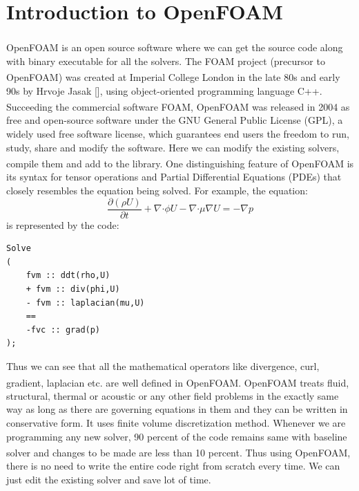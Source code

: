 \chapter{Introduction to \texorpdfstring{OpenFOAM\textsuperscript{\textregistered}}{Introduction to OpenFOAMs} }

\label{openfoam}

OpenFOAM\textsuperscript{\textregistered} is an open source software where we can get the source code along with binary executable for all the solvers. The FOAM project (precursor to OpenFOAM\textsuperscript{\textregistered}) was created at Imperial College London in the late 80s and early 90s by Hrvoje Jasak [], using object-oriented programming language C++. Succeeding the commercial software FOAM, OpenFOAM\textsuperscript{\textregistered} was released in 2004 as free and open-source software under the GNU General Public License (GPL), a widely used free software license, which guarantees end users the freedom to run, study, share and modify the software. Here we can modify the existing solvers, compile them and add to the library. One distinguishing feature of OpenFOAM\textsuperscript{\textregistered} is its syntax for tensor operations and Partial Differential Equations (PDEs) that closely resembles the equation being solved. For example, the equation: 
\begin{equation}
\dfrac{\partial(\rho U)}{\partial t} + \nabla \boldsymbol{\cdot} \phi U - \nabla \boldsymbol{\cdot} \mu \nabla U = - \nabla p
\end{equation}
is represented by the code: 
\begin{verbatim}
Solve
(
	fvm :: ddt(rho,U)
	+ fvm :: div(phi,U)
	- fvm :: laplacian(mu,U)
	==
	-fvc :: grad(p)
);

\end{verbatim}

Thus we can see that all the mathematical operators like divergence, curl, gradient, laplacian etc. are well defined in OpenFOAM\textsuperscript{\textregistered}. OpenFOAM\textsuperscript{\textregistered} treats fluid, structural, thermal or acoustic or any other field problems in the exactly same way as long as there are governing equations in them and they can be written in conservative form. It uses finite volume discretization method. Whenever we are programming any new solver, 90 percent of the code remains same with baseline solver and changes to be made are less than 10 percent. Thus using OpenFOAM\textsuperscript{\textregistered}, there is no need to write the entire code right from scratch every time. We can just edit the existing solver and save lot of time.

